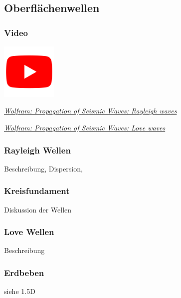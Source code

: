 \subsection{Oberflächenwellen}

\begin{frame}
\frametitle{Video}
\begin{center}
\includegraphics[width=0.2\textwidth]{fig_img/youtube.png}   
\end{center}

\href{https://www.youtube.com/watch?v=6yXgfYHAS7c}{\textsl{Wolfram: Propagation of Seismic Waves: Rayleigh waves}}

\href{https://www.youtube.com/watch?v=t7wJu0Kts7w}{\textsl{Wolfram: Propagation of Seismic Waves: Love waves}}

\end{frame}


\begin{frame}
\frametitle{Rayleigh Wellen}
Beschreibung, Dispersion,

\end{frame}


\begin{frame}
\frametitle{Kreisfundament}
Diskussion der Wellen

\end{frame}


\begin{frame}
\frametitle{Love Wellen}
Beschreibung
\end{frame}


\begin{frame}
\frametitle{Erdbeben}
siehe 1.5D
\end{frame}


